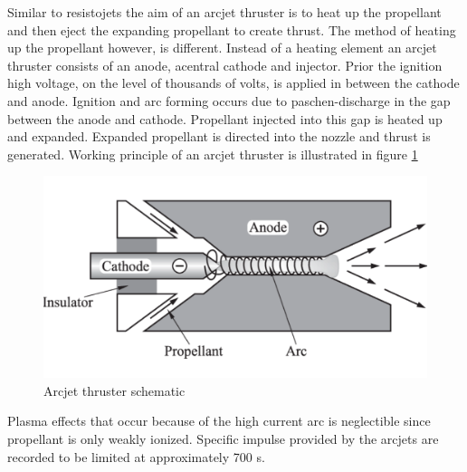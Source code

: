 
Similar to resistojets the aim of an arcjet thruster is to heat up the propellant and then eject the expanding propellant to create thrust. The method of heating up the propellant however, is different. Instead of a heating element an arcjet thruster consists of an anode, acentral cathode and injector. Prior the ignition high voltage, on the level of thousands of volts, is applied in between the cathode and anode. Ignition and arc forming occurs due to paschen-discharge\cite{wadhwa2006high} in the gap between the anode and cathode. Propellant injected into this gap is heated up and expanded. Expanded propellant is directed into the nozzle and thrust is generated. Working principle of an arcjet thruster is illustrated in figure \ref{fig:arcjet}

\begin{figure}[htb]
    \centering
    \includegraphics[scale=0.65]{fig/arcjet.png}
    \caption[Arcjet thruster schematic]{Arcjet thruster schematic\cite{bock2011electric}}
    \label{fig:arcjet}
\end{figure}

Plasma effects that occur because of the high current arc is neglectible since propellant is only weakly ionized. Specific impulse provided by the arcjets are recorded to be limited at approximately 700 s\cite{goebel2008fundamentals}.

